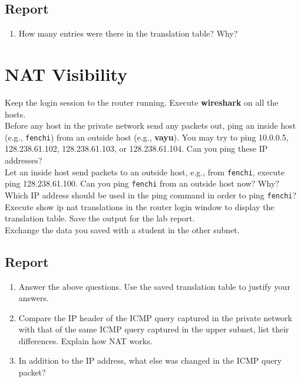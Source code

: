 \documentclass[10pt,a4paper]{article}
\numberwithin{equation}{section}
\numberwithin{figure}{section}
\numberwithin{table}{section}
\begin{document}
    \subsection*{Report}
    \begin{enumerate}
        \item How many entries were there in the translation table?
        Why?
    \end{enumerate}

    \section*{NAT Visibility}
    Keep the login session to the router running. Execute \textbf{wireshark} on all the hosts. \\
    Before any host in the private network send any packets out, ping an inside host (e.g., \texttt{fenchi}) from an outside host (e.g., \textbf{vayu}). You may try to ping 10.0.0.5, 128.238.61.102, 128.238.61.103, or 128.238.61.104. Can you ping these IP addresses? \\
    Let an inside host send packets to an outside host, e.g., from \texttt{fenchi}, execute ping 128.238.61.100. Can you ping \texttt{fenchi} from an outside host now? Why? Which IP address should be used in the ping command in order to ping \texttt{fenchi}? \\
    Execute show ip nat translations in the router login window to display the translation table. Save the output for the lab report. \\
    Exchange the data you saved with a student in the other subnet.
    \subsection*{Report}
    \begin{enumerate}
        \item Answer the above questions.
        Use the saved translation table to justify your answers.
        \item Compare the IP header of the ICMP query captured in the private network with that of the same ICMP query captured in the upper subnet, list their differences.
        Explain how NAT works.
        \item In addition to the IP address, what else was changed in the ICMP query packet?
    \end{enumerate}
\end{document}
